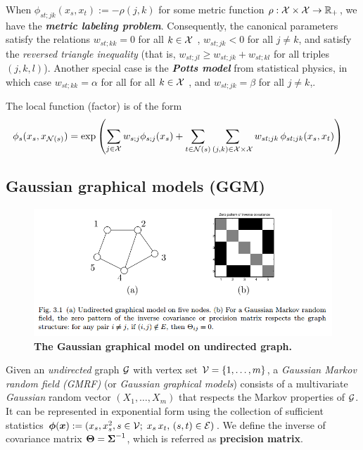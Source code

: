 \documentclass[11pt]{article}
\begin{document}
When $\phi_{st;jk}(x_s, x_t) :=- \rho(j, k)$ for some metric function $\rho: {\mathcal X} \times {\mathcal X} \rightarrow {\mathbb R}_{+}$, we have the \textbf{\emph{metric labeling problem}}. Consequently, the canonical parameters satisfy the relations $w_{st;kk} = 0$ for all $k \in {\mathcal X}$ , $w_{st;jk} < 0$ for all $j \neq k$, and satisfy the \emph{reversed triangle inequality} (that is, $w_{st;jl} \ge w_{st;jk} + w_{st;kl}$ for all triples $(j, k, l)$).  Another special case is the \textbf{\emph{Potts model}} from statistical physics, in which case $w_{st;kk} = \alpha$ for all for all $k \in {\mathcal X}$ , and $w_{st;jk} = \beta$ for all $j \neq k$,.

The local function (factor) is of the form
\begin{align*}
\phi_{s}(x_s, x_{{\mathcal N}(s)}) &=  \exp\left(\sum_{j \in {\mathcal X}}w_{s;j}\phi_{s;j}(x_s) + \sum_{t\in {\mathcal N}(s)}\sum_{(j,k) \in {\mathcal X} \times {\mathcal X}}w_{st;jk}\,\phi_{st;jk}(x_s, x_t)\right)
\end{align*} 

\subsection{Gaussian graphical models (GGM)}
\begin{figure}
\begin{minipage}[t]{1\linewidth}
  \centering
  \centerline{\includegraphics[scale = 0.45]{ggm.png}}
\end{minipage}
\caption{\footnotesize{\textbf{The Gaussian graphical model on undirected graph.}}}
\label{fig: ggm}
\end{figure}
Given an \emph{undirected} graph ${\mathcal G}$ with vertex set ${\mathcal V} = \{1,\ldots,m\}$, a \emph{Gaussian Markov random field (GMRF)} (or \emph{Gaussian graphical models}) \citep{wainwright2008graphical} consists of a multivariate \emph{Gaussian} random vector $(X_1,\ldots,X_m)$ that respects the Markov properties of ${\mathcal G}$. It can be
represented in exponential form using the collection of sufficient statistics $\boldsymbol{\phi}(\boldsymbol{x}): = (x_s, x_s^2, s \in {\mathcal V}; \; x_s\,x_t, \, (s,t) \in {\mathcal E})$. We define the inverse of covariance matrix $\boldsymbol{\Theta} = \boldsymbol{\Sigma}^{-1}$, which is referred as \textbf{precision matrix}. 
\end{document}
